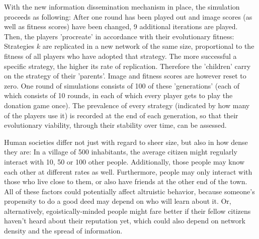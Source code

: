 \documentclass[12pt]{article}
\begin{document}
With the new information dissemination mechanism in place, the simulation proceeds as following: After one round has been played out and image scores (as well as fitness scores) have been changed, 9 additional iterations are played. Then, the players 'procreate' in accordance with their evolutionary fitness: Strategies $k$ are replicated in a new network of the same size, proportional to the fitness of all players who have adopted that strategy. The more successful a specific strategy, the higher its rate of replication. Therefore the 'children' carry on the strategy of their 'parents'. Image and fitness scores are however reset to zero. One round of simulations consists of 100 of these 'generations' (each of which consists of 10 rounds, in each of which every player gets to play the donation game once). The prevalence of every strategy (indicated by how many of the players use it) is recorded at the end of each generation, so that their evolutionary viability, through their stability over time, can be assessed.

Human societies differ not just with regard to sheer size, but also in how dense they are: In a village of 500 inhabitants, the average citizen might regularly interact with 10, 50 or 100 other people. Additionally, those people may know each other at different rates as well. Furthermore, people may only interact with those who live close to them, or also have friends at the other end of the town. All of these factors could potentially affect altruistic behavior, because someone's propensity to do a good deed may depend on who will learn about it. Or, alternatively, egoistically-minded people might fare better if their fellow citizens haven't heard about their reputation yet, which could also depend on network density and the spread of information.
\end{document}
